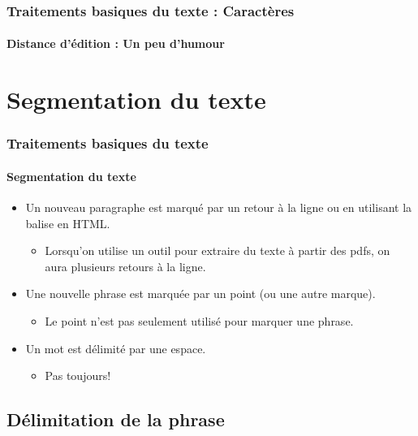 \documentclass[xcolor=table]{beamer}
\begin{document}
\begin{frame}
\frametitle{Traitements basiques du texte : Caractères}
\framesubtitle{Distance d'édition : Un peu d'humour}

\begin{center}
\end{center}

\end{frame}

\section{Segmentation du texte}

\begin{frame}
\frametitle{Traitements basiques du texte}
\framesubtitle{Segmentation du texte}

\begin{itemize}
	\item Un nouveau paragraphe est marqué par un retour à la ligne ou en utilisant la balise  en HTML.
	\begin{itemize}
		\item Lorsqu'on utilise un outil pour extraire du texte à partir des pdfs, on aura plusieurs retours à la ligne. 
	\end{itemize}
	\item Une nouvelle phrase est marquée par un point (ou une autre marque).
	\begin{itemize}
		\item Le point n'est pas seulement utilisé pour marquer une phrase.
	\end{itemize}
	\item Un mot est délimité par une espace.
	\begin{itemize}
		\item Pas toujours!
	\end{itemize}
\end{itemize}

\end{frame}

\subsection{Délimitation de la phrase}
\end{document}
